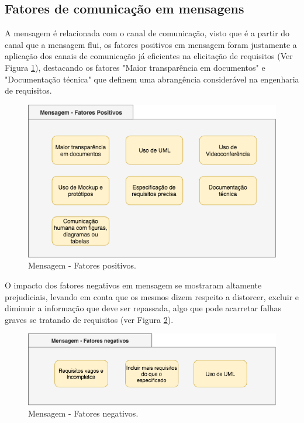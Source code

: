 \subsection{Fatores de comunicação em mensagens}

A mensagem é relacionada com o canal de comunicação, visto que é a partir do canal que a mensagem flui, os fatores positivos em mensagem foram justamente a aplicação dos canais de comunicação já eficientes na elicitação de requisitos (Ver Figura \ref{fig:quadro9}), destacando os fatores "Maior transparência em documentos" e  "Documentação técnica" que definem uma abrangência considerável na engenharia de requisitos.


\begin{figure}[h!] %
	\begin{center}
	    \caption{Mensagem - Fatores positivos.}
	    	\label{fig:quadro9}
	    \includegraphics[scale=0.6]{figuras/quadro9} %
	\end{center}

\end{figure}

O impacto dos fatores negativos em mensagem se mostraram altamente prejudiciais, levando em conta que os mesmos dizem respeito a distorcer, excluir e diminuir a informação que deve ser repassada, algo que pode acarretar falhas graves se tratando de requisitos (ver Figura \ref{fig:quadro10}). 

\begin{figure}[h!] %
	\begin{center}
	    \caption{Mensagem - Fatores negativos.}
	    	\label{fig:quadro10}
	    \includegraphics[scale=0.6]{figuras/quadro10} %
	\end{center}

\end{figure}

